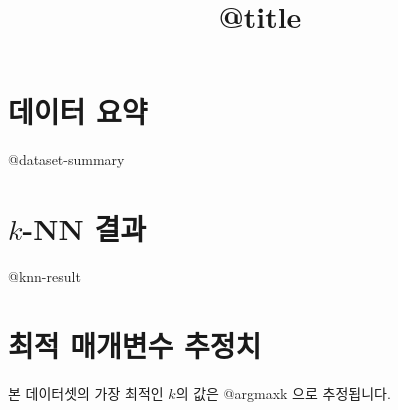\documentclass[a4paper]{article}
\title{@title}
\begin{document}
    \maketitle
    \section{데이터 요약}
    @dataset-summary

    \section{$k$-NN 결과}
    @knn-result

    \section{최적 매개변수 추정치}
    본 데이터셋의 가장 최적인 $k$의 값은 @argmaxk 으로 추정됩니다.
\end{document}
